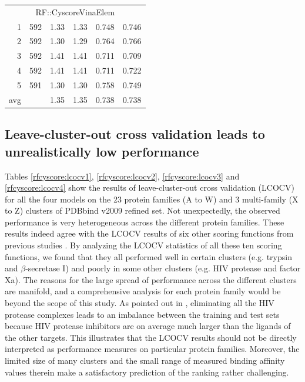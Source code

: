 \begin{table}
\begin{tabular}{rrrrrr}
\hline
\multicolumn{6}{c}{RF::CyscoreVinaElem}\\
  1 & 592 & 1.33 & 1.33 & 0.748 & 0.746\\
  2 & 592 & 1.30 & 1.29 & 0.764 & 0.766\\
  3 & 592 & 1.41 & 1.41 & 0.711 & 0.709\\
  4 & 592 & 1.41 & 1.41 & 0.711 & 0.722\\
  5 & 591 & 1.30 & 1.30 & 0.758 & 0.749\\
avg &     & 1.35 & 1.35 & 0.738 & 0.738\\
\hline
\end{tabular}
\end{table}

\subsection{Leave-cluster-out cross validation leads to unrealistically low performance}

Tables \ref{rfcyscore:lcocv1}, \ref{rfcyscore:lcocv2}, \ref{rfcyscore:lcocv3} and \ref{rfcyscore:lcocv4} show the results of leave-cluster-out cross validation (LCOCV) for all the four models on the 23 protein families (A to W) and 3 multi-family (X to Z) clusters of PDBbind v2009 refined set. Not unexpectedly, the observed performance is very heterogeneous across the different protein families. These results indeed agree with the LCOCV results of six other scoring functions from previous studies \citep{774,1414,1194,1410,1347,1415}. By analyzing the LCOCV statistics of all these ten scoring functions, we found that they all performed well in certain clusters (e.g. trypsin and $\beta$-secretase I) and poorly in some other clusters (e.g. HIV protease and factor Xa). The reasons for the large spread of performance across the different clusters are manifold, and a comprehensive analysis for each protein family would be beyond the scope of this study. As pointed out in \citep{1347}, eliminating all the HIV protease complexes leads to an imbalance between the training and test sets because HIV protease inhibitors are on average much larger than the ligands of the other targets. This illustrates that the LCOCV results should not be directly interpreted as performance measures on particular protein families. Moreover, the limited size of many clusters and the small range of measured binding affinity values therein make a satisfactory prediction of the ranking rather challenging.

